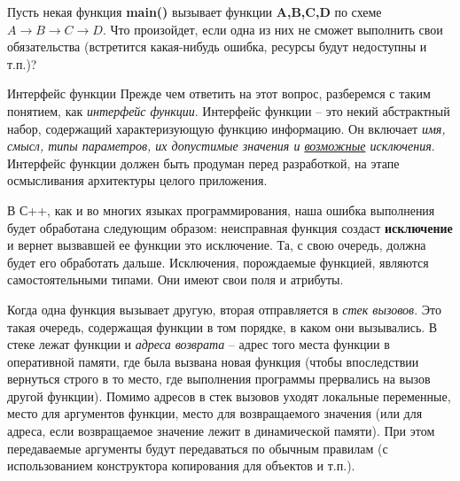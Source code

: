 \renewcommand{\mainFolder}{/home/aleksei/github_projects/latex_works/informatics/3sem}
\renewcommand{\myFolder}{\mainFolder/lecture_\arabic{lectureNo}/}

\renewcommand{\lectureSubject}{Исключения в С++}
%



\begin{lecture}[\lectureSubject]
	\begin{lecSection}
		Пусть некая функция \textbf{main()} вызывает функции \textbf{A,B,C,D} по схеме $A\rightarrow B\rightarrow C\rightarrow D$. Что произойдет, если одна из них не сможет выполнить свои обязательства (встретится какая-нибудь ошибка, ресурсы будут недоступны и т.п.)?
		\begin{lecSubsection}{Интерфейс функции}
			Прежде чем ответить на этот вопрос, разберемся с таким понятием, как \textit{интерфейс функции}. Интерфейс функции -- это некий абстрактный набор, содержащий характеризующую функцию информацию. Он включает \textit{имя, смысл, типы параметров, их допустимые значения и \underline{возможные} исключения}. Интерфейс функции должен быть продуман перед разработкой, на этапе осмысливания архитектуры целого приложения.
		\end{lecSubsection}
	\end{lecSection}
	\begin{lecSection}[Исключения в С++]
		\label{exc1}
		В С++, как и во многих языках программирования, наша ошибка выполнения будет обработана следующим образом: неисправная функция создаст \textbf{исключение} и вернет вызвавшей ее функции это исключение. Та, с свою очередь, должна будет его обработать дальше. Исключения, порождаемые функцией, являются самостоятельными типами. Они имеют свои поля и атрибуты.
	\end{lecSection}
	\begin{lecSection}
			Когда одна функция вызывает другую, вторая отправляется в \textit{стек вызовов}. Это такая очередь, содержащая функции в том порядке, в каком они вызывались. В стеке лежат функции и \textit{адреса возврата} -- адрес того места функции в оперативной памяти, где была вызвана новая функция (чтобы впоследствии вернуться строго в то место, где выполнения программы прервались на вызов другой функции). Помимо адресов в стек вызовов уходят локальные переменные, место для аргументов функции, место для возвращаемого значения (или для адреса, если возвращаемое значение лежит в динамической памяти). При этом передаваемые аргументы будут передаваться по обычным правилам (с использованием конструктора копирования для объектов и т.п.).

\end{lecSection}
\end{lecture}
